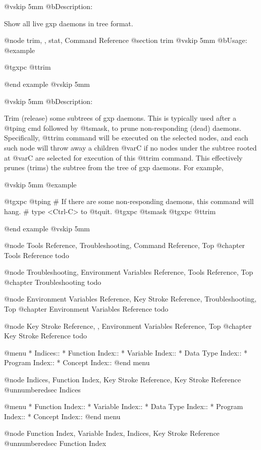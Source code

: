 @vskip 5mm
@b{Description:}


  Show all live gxp daemons in tree format.

@node trim,  , stat, Command Reference
@section trim
@vskip 5mm
@b{Usage:}
@example

  @t{gxpc} @t{trim}

@end example
@vskip 5mm

@vskip 5mm
@b{Description:}


  Trim (release) some subtrees of gxp daemons. This is typically
used after a @t{ping} cmd followed by @t{smask}, to prune non-responding
(dead) daemons.  Specifically, @t{trim} command will be executed on
the selected nodes, and each such node will throw away a children
@var{C} if no nodes under the subtree rooted at @var{C} are selected for
execution of this @t{trim} command. This effectively prunes (trims)
the subtree from the tree of gxp daemons. For example,

@vskip 5mm
@example

  @t{gxpc} @t{ping}
  # If there are some non-responding daemons, this command will hang.
  # type <Ctrl-C> to @t{quit}.
  @t{gxpc} @t{smask}
  @t{gxpc} @t{trim}

@end example
@vskip 5mm


@node Tools Reference, Troubleshooting, Command Reference, Top
@chapter Tools Reference
todo

@node Troubleshooting, Environment Variables Reference, Tools Reference, Top
@chapter Troubleshooting
todo

@node Environment Variables Reference, Key Stroke Reference, Troubleshooting, Top
@chapter Environment Variables Reference
todo

@node Key Stroke Reference,  , Environment Variables Reference, Top
@chapter Key Stroke Reference
todo

@menu
* Indices::                     
* Function Index::              
* Variable Index::              
* Data Type Index::             
* Program Index::               
* Concept Index::               
@end menu

@node Indices, Function Index, Key Stroke Reference, Key Stroke Reference
@unnumberedsec Indices

@menu
* Function Index::              
* Variable Index::              
* Data Type Index::             
* Program Index::               
* Concept Index::               
@end menu

@node Function Index, Variable Index, Indices, Key Stroke Reference
@unnumberedsec Function Index

